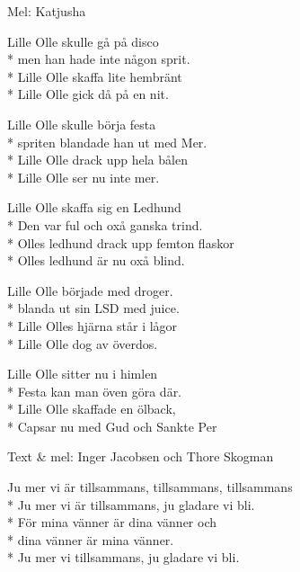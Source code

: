 \begin{SongText}
    \begin{SongInfo}
        Mel: Katjusha\
    \end{SongInfo}
    \begin{SongVerse}
        Lille Olle skulle gå på disco\\*%
        men han hade inte någon sprit.\\*%
        Lille Olle skaffa lite hembränt\\*%
        Lille Olle gick då på en nit.
    \end{SongVerse}
    \begin{SongVerse}
        Lille Olle skulle börja festa\\*%
        spriten blandade han ut med Mer.\\*%
        Lille Olle drack upp hela bålen\\*%
        Lille Olle ser nu inte mer.
    \end{SongVerse}
    \begin{SongVerse}
        Lille Olle skaffa sig en Ledhund\\*%
        Den var ful och oxå ganska trind.\\*%
        Olles ledhund drack upp femton flaskor\\*%
        Olles ledhund är nu oxå blind.
    \end{SongVerse}
    \begin{SongVerse}
        Lille Olle började med droger.\\*%
        blanda ut sin LSD med juice.\\*%
        Lille Olles hjärna står i lågor\\*%
        Lille Olle dog av överdos.
    \end{SongVerse}
    \begin{SongVerse}
        Lille Olle sitter nu i himlen\\*%
        Festa kan man öven göra där.\\*%
        Lille Olle skaffade en ölback,\\*%
        Capsar nu med Gud och Sankte Per
    \end{SongVerse}
\end{SongText}
\begin{SongText}
    \begin{SongInfo}
        Text \& mel: Inger Jacobsen och Thore Skogman
    \end{SongInfo}
    \begin{SongVerse}
        Ju mer vi är tillsammans, tillsammans, tillsammans\\*%
        Ju mer vi är tillsammans, ju gladare vi bli.\\*%
        För mina vänner är dina vänner och\\*%
        dina vänner är mina vänner.\\*%
        Ju mer vi tillsammans, ju gladare vi bli. 
    \end{SongVerse}
\end{SongText}

